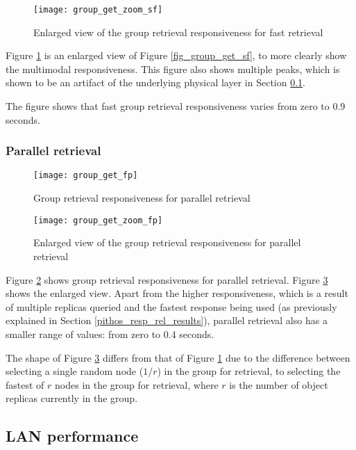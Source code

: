 \begin{figure}[htbp]
 \centering
 \texttt{[image: group\_get\_zoom\_sf]}
 \caption{Enlarged view of the group retrieval responsiveness for fast retrieval}
 \label{fig_group_get_zoom_sf}
\end{figure}
%
Figure \ref{fig_group_get_zoom_sf} is an enlarged view of Figure \ref{fig_group_get_sf}, to more clearly show the multimodal responsiveness. This figure also shows multiple peaks, which is shown to be an artifact of the underlying physical layer in Section \ref{lan_retrieval}.

The figure shows that fast group retrieval responsiveness varies from zero to 0.9 seconds.

\subsubsection{Parallel retrieval}
\begin{figure}[htbp]
 \centering
 \texttt{[image: group\_get\_fp]}
 \caption{Group retrieval responsiveness for parallel retrieval}
 \label{fig_group_get_fp}
\end{figure}

\begin{figure}[htbp]
 \centering
 \texttt{[image: group\_get\_zoom\_fp]}
 \caption{Enlarged view of the group retrieval responsiveness for parallel retrieval}
 \label{fig_group_get_zoom_fp}
\end{figure}
%
Figure \ref{fig_group_get_fp} shows group retrieval responsiveness for parallel retrieval. Figure \ref{fig_group_get_zoom_fp} shows the enlarged view. Apart from the higher responsiveness, which is a result of multiple replicas queried and the fastest response being used (as previously explained in Section \ref{pithos_resp_rel_results}), parallel retrieval also has a smaller range of values: from zero to 0.4 seconds.

The shape of Figure \ref{fig_group_get_zoom_fp} differs from that of Figure \ref{fig_group_get_zoom_sf} due to the difference between selecting a single random node ($1/r$) in the group for retrieval, to selecting the fastest of $r$ nodes in the group for retrieval, where $r$ is the number of object replicas currently in the group.

\subsection{LAN performance}
\label{lan_retrieval}


